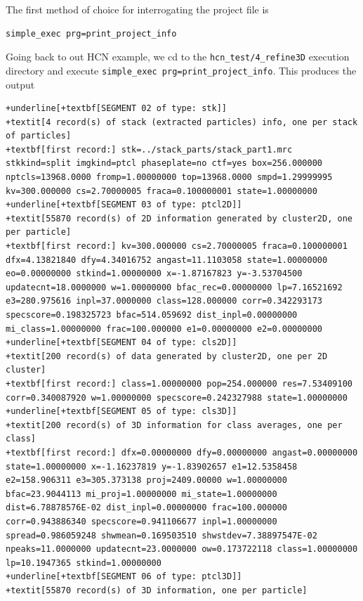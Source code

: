 \documentclass[a4paper,11pt]{article}
\begin{document}
\noindent{}The first method of choice for interrogating the project file is

\begin{Verbatim}[commandchars=+\[\],fontsize=\small,breaklines=true]
simple_exec prg=print_project_info
\end{Verbatim}

\noindent{}Going back to out HCN example, we cd to the \texttt{hcn\_test/4\_refine3D} execution directory and execute \texttt{simple\_exec prg=print\_project\_info}. This produces the output
\begin{Verbatim}[commandchars=+\[\],fontsize=\small,breaklines=true]
+underline[+textbf[SEGMENT 02 of type: stk]]
+textit[4 record(s) of stack (extracted particles) info, one per stack of particles]
+textbf[first record:] stk=../stack_parts/stack_part1.mrc stkkind=split imgkind=ptcl phaseplate=no ctf=yes box=256.000000 nptcls=13968.0000 fromp=1.00000000 top=13968.0000 smpd=1.29999995 kv=300.000000 cs=2.70000005 fraca=0.100000001 state=1.00000000
+underline[+textbf[SEGMENT 03 of type: ptcl2D]]
+textit[55870 record(s) of 2D information generated by cluster2D, one per particle]
+textbf[first record:] kv=300.000000 cs=2.70000005 fraca=0.100000001 dfx=4.13821840 dfy=4.34016752 angast=11.1103058 state=1.00000000 eo=0.00000000 stkind=1.00000000 x=-1.87167823 y=-3.53704500 updatecnt=18.0000000 w=1.00000000 bfac_rec=0.00000000 lp=7.16521692 e3=280.975616 inpl=37.0000000 class=128.000000 corr=0.342293173 specscore=0.198325723 bfac=514.059692 dist_inpl=0.00000000 mi_class=1.00000000 frac=100.000000 e1=0.00000000 e2=0.00000000
+underline[+textbf[SEGMENT 04 of type: cls2D]]
+textit[200 record(s) of data generated by cluster2D, one per 2D cluster]
+textbf[first record:] class=1.00000000 pop=254.000000 res=7.53409100 corr=0.340087920 w=1.00000000 specscore=0.242327988 state=1.00000000
+underline[+textbf[SEGMENT 05 of type: cls3D]]
+textit[200 record(s) of 3D information for class averages, one per class]
+textbf[first record:] dfx=0.00000000 dfy=0.00000000 angast=0.00000000 state=1.00000000 x=-1.16237819 y=-1.83902657 e1=12.5358458 e2=158.906311 e3=305.373138 proj=2409.00000 w=1.00000000 bfac=23.9044113 mi_proj=1.00000000 mi_state=1.00000000 dist=6.78878576E-02 dist_inpl=0.00000000 frac=100.000000 corr=0.943886340 specscore=0.941106677 inpl=1.00000000 spread=0.986059248 shwmean=0.169503510 shwstdev=7.38897547E-02 npeaks=11.0000000 updatecnt=23.0000000 ow=0.173722118 class=1.00000000 lp=10.1947365 stkind=1.00000000
+underline[+textbf[SEGMENT 06 of type: ptcl3D]]
+textit[55870 record(s) of 3D information, one per particle]

\end{Verbatim}
\end{document}
